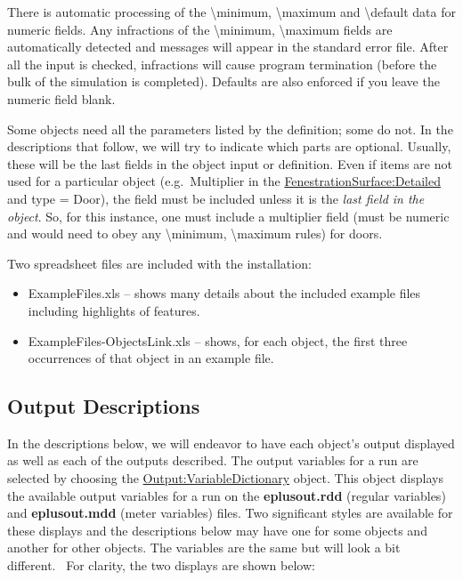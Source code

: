 There is automatic processing of the \textbackslash{}minimum, \textbackslash{}maximum and \textbackslash{}default data for numeric fields. Any infractions of the \textbackslash{}minimum, \textbackslash{}maximum fields are automatically detected and messages will appear in the standard error file. After all the input is checked, infractions will cause program termination (before the bulk of the simulation is completed). Defaults are also enforced if you leave the numeric field blank.

Some objects need all the parameters listed by the definition; some do not. In the descriptions that follow, we will try to indicate which parts are optional. Usually, these will be the last fields in the object input or definition. Even if items are not used for a particular object (e.g.~Multiplier in the \hyperref[fenestrationsurfacedetailed]{FenestrationSurface:Detailed} and type = Door), the field must be included unless it is the \emph{last field in the object}. So, for this instance, one must include a multiplier field (must be numeric and would need to obey any \textbackslash{}minimum, \textbackslash{}maximum rules) for doors.

Two spreadsheet files are included with the installation:

\begin{itemize}
\item
  ExampleFiles.xls -- shows many details about the included example files including highlights of features.
\item
  ExampleFiles-ObjectsLink.xls -- shows, for each object, the first three occurrences of that object in an example file.
\end{itemize}

\subsection{Output Descriptions}\label{output-descriptions}

In the descriptions below, we will endeavor to have each object's output displayed as well as each of the outputs described. The output variables for a run are selected by choosing the \hyperref[output-variabledictionary]{Output:VariableDictionary} object. This object displays the available output variables for a run on the \textbf{eplusout.rdd} (regular variables) and \textbf{eplusout.mdd} (meter variables) files. Two significant styles are available for these displays and the descriptions below may have one for some objects and another for other objects. The variables are the same but will look a bit different.~ For clarity, the two displays are shown below:

